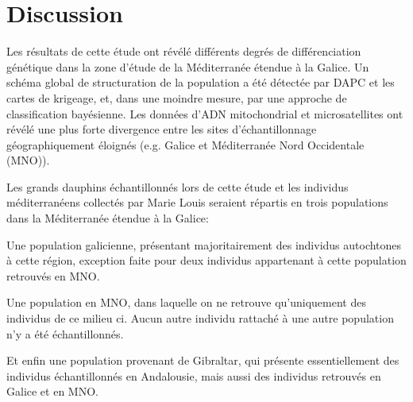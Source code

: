 \documentclass[a4paper,12pt,twoside]{article}\usepackage[]{graphicx}\usepackage[]{color}
\begin{document}
\section*{Discussion} 

Les résultats de cette étude ont révélé différents degrés de différenciation génétique dans la zone d'étude de la Méditerranée étendue à la Galice. Un schéma global de structuration de la population a été détectée par DAPC et les cartes de krigeage, et, dans une moindre mesure, par une approche de classification bayésienne. Les données d'ADN mitochondrial et microsatellites ont révélé une plus forte divergence entre les sites d'échantillonnage géographiquement éloignés (e.g. Galice et Méditerranée Nord Occidentale (MNO)).

Les grands dauphins échantillonnés lors de cette étude et les individus méditerranéens collectés par Marie Louis seraient répartis en trois populations dans la Méditerranée étendue à la Galice: 

Une population galicienne, présentant majoritairement des individus autochtones à cette région, exception faite pour deux individus appartenant à cette population retrouvés en MNO. 

Une population en MNO, dans laquelle on ne retrouve qu'uniquement des individus de ce milieu ci. Aucun autre individu rattaché à une autre population n'y a été échantillonnés. 

Et enfin une population provenant de Gibraltar, qui présente essentiellement des individus échantillonnés en Andalousie, mais aussi des individus retrouvés en Galice et en MNO. 
\end{document}
